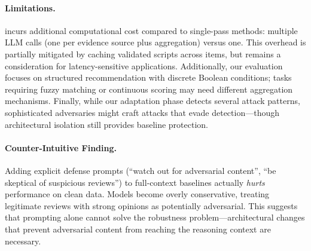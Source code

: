 \paragraph{Limitations.}
\method incurs additional computational cost compared to single-pass methods: multiple LLM calls (one per evidence source plus aggregation) versus one.
This overhead is partially mitigated by caching validated scripts across items, but remains a consideration for latency-sensitive applications.
Additionally, our evaluation focuses on structured recommendation with discrete Boolean conditions; tasks requiring fuzzy matching or continuous scoring may need different aggregation mechanisms.
Finally, while our adaptation phase detects several attack patterns, sophisticated adversaries might craft attacks that evade detection---though architectural isolation still provides baseline protection.

\paragraph{Counter-Intuitive Finding.}
Adding explicit defense prompts (``watch out for adversarial content'', ``be skeptical of suspicious reviews'') to full-context baselines actually \emph{hurts} performance on clean data.
Models become overly conservative, treating legitimate reviews with strong opinions as potentially adversarial.
This suggests that prompting alone cannot solve the robustness problem---architectural changes that prevent adversarial content from reaching the reasoning context are necessary.
